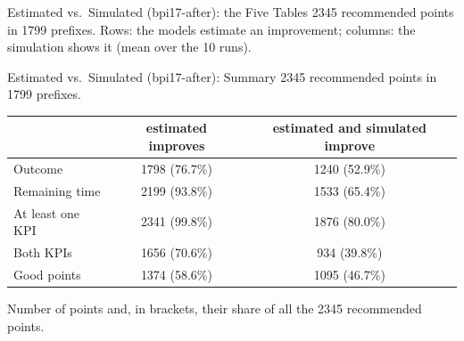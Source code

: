 \documentclass[aspectratio=169]{beamer} %
\begin{document}
\begin{frame}{Estimated vs.\ Simulated (bpi17-after): the Five Tables}
  \footnotesize
  2345 recommended points in 1799 prefixes. Rows: the models estimate an improvement; columns: the
  simulation shows it (mean over the 10 runs).
  \par\vspace{0.3cm}\noindent
  \hfill
  \hfill
  \par\vspace{0.5cm}\noindent\hspace*{\fill}%
  \hspace{0.08\textwidth}%
  \hspace*{\fill}
\end{frame}

\begin{frame}{Estimated vs.\ Simulated (bpi17-after): Summary}
  \footnotesize\setlength{\aboverulesep}{0pt}\setlength{\belowrulesep}{1pt}
  2345 recommended points in 1799 prefixes.
  \begin{center}\setlength{\tabcolsep}{6pt}
  \begin{tabular}{lcc}
    \toprule
     & estimated improves & estimated and simulated improve \\
    \midrule
    Outcome & 1798 (76.7\%) & 1240 (52.9\%) \\
    Remaining time & 2199 (93.8\%) & 1533 (65.4\%) \\
    At least one KPI & 2341 (99.8\%) & 1876 (80.0\%) \\
    Both KPIs & 1656 (70.6\%) & 934 (39.8\%) \\
    Good points & 1374 (58.6\%) & 1095 (46.7\%) \\
    \bottomrule
  \end{tabular}
  \end{center}
  {\scriptsize Number of points and, in brackets, their share of all the 2345 recommended points.}
\end{frame}
\end{document}
